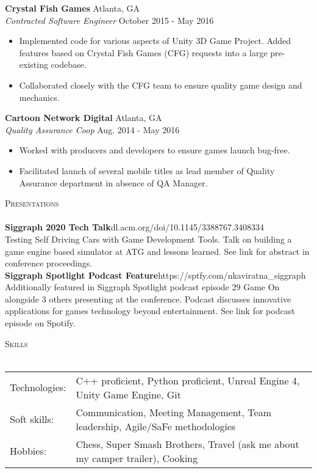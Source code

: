 \documentclass[a4paper]{article}
\newcommand{\lineunder} {
    \vspace*{-8pt} \\
    \hspace*{-18pt} \hrulefill \\
}
\newcommand{\header} [1] {
    {\hspace*{-18pt}\vspace*{6pt} \textsc{#1}}
    \vspace*{-6pt} \lineunder
}
\begin{document}
\textbf{Crystal Fish Games} \hfill Atlanta, GA\\
\textit{Contracted Software Engineer} \hfill October 2015 - May 2016\\
\vspace{-1mm}
\begin{itemize} \itemsep 1pt
	\item Implemented code for various aspects of Unity 3D Game Project. Added features based on Crystal Fish Games (CFG) requests into a large pre-existing codebase.
	\item Collaborated closely with the CFG team to ensure quality game design and mechanics.
\end{itemize}
\textbf{Cartoon Network Digital} \hfill Atlanta, GA\\
\textit{Quality Assurance Coop} \hfill Aug. 2014 - May 2016\\
\vspace{-1mm}
\begin{itemize} \itemsep 1pt
	\item Worked with producers and developers to ensure games launch bug-free.
	\item Facilitated launch of several mobile titles as lead member of Quality Assurance department in absence of QA Manager.
\end{itemize}

\header{Presentations}
{\textbf{Siggraph 2020 Tech Talk}}\hfill dl.acm.org/doi/10.1145/3388767.3408334\\
\textquotedbl{}Testing Self Driving Cars with Game Development Tools\textquotedbl{}. Talk on building a game engine based simulator at ATG and lessons learned. See link for abstract in conference proceedings.\\
\vspace*{2mm}
{\textbf{Siggraph Spotlight Podcast Feature}}\hfill https://sptfy.com/nkaviratna\_siggraph\\
Additionally featured in Siggraph Spotlight podcast episode 29 \textquotedbl{}Game On\textquotedbl{} alongside 3 others presenting at the conference. Podcast discusses innovative applications for games technology beyond entertainment. See link for podcast episode on Spotify.\\
\vspace*{2mm}

\header{Skills}
\begin{tabular}{ l l }
	Technologies: & C++ proficient, Python proficient, Unreal Engine 4, Unity Game Engine, Git    \\
	Soft skills:  & Communication, Meeting Management, Team leadership, Agile/SaFe methodologies  \\
	Hobbies:      & Chess, Super Smash Brothers, Travel (ask me about my camper trailer), Cooking \\
\end{tabular}
\vspace{2mm}
\end{document}
